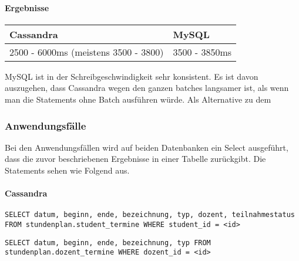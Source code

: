 \paragraph{Ergebnisse}
\begin{tabular}{|p{7cm}|p{7cm}|}
	\hline
	\textbf{Cassandra} & \textbf{MySQL}\\
	\hline
	2500 - 6000ms (meistens 3500 - 3800) & 3500 - 3850ms\\
	\hline
\end{tabular}

\vspace{6pt}

MySQL ist in der Schreibgeschwindigkeit sehr konsistent. Es ist davon auszugehen, dass Cassandra wegen den ganzen batches langsamer ist, als wenn man die Statements ohne Batch ausführen würde. Als Alternative zu dem 

\newpage

\subsubsection{Anwendungsfälle}
Bei den Anwendungsfällen wird auf beiden Datenbanken ein Select ausgeführt, dass die zuvor beschriebenen Ergebnisse in einer Tabelle zurückgibt. Die Statements sehen wie Folgend aus.

\vspace{6pt}

\paragraph{Cassandra}
\begin{lstlisting}
SELECT datum, beginn, ende, bezeichnung, typ, dozent, teilnahmestatus FROM stundenplan.student_termine WHERE student_id = <id>
\end{lstlisting} 
\begin{lstlisting}
SELECT datum, beginn, ende, bezeichnung, typ FROM stundenplan.dozent_termine WHERE dozent_id = <id>
\end{lstlisting} 

\vspace{6pt}

